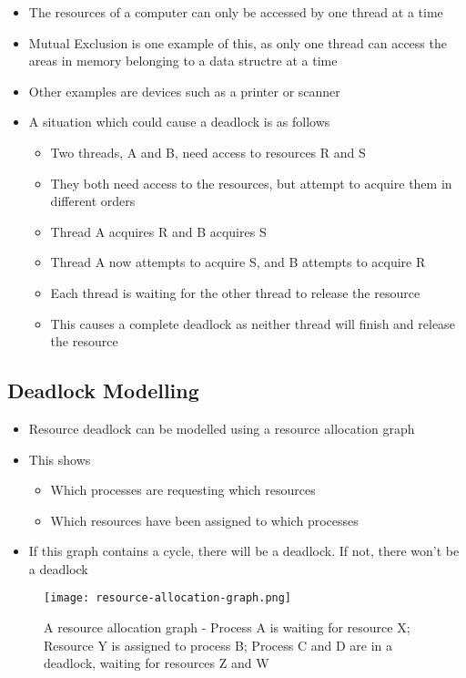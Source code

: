 \begin{itemize}
  \item The resources of a computer can only be accessed by one thread at a time
  \item Mutual Exclusion is one example of this, as only one thread can access the areas in memory belonging to a data structre at a time
  \item Other examples are devices such as a printer or scanner
  \item A situation which could cause a deadlock is as follows
  \begin{itemize}
    \item Two threads, A and B, need access to resources R and S
    \item They both need access to the resources, but attempt to acquire them in different orders
    \item Thread A acquires R and B acquires S
    \item Thread A now attempts to acquire S, and B attempts to acquire R
    \item Each thread is waiting for the other thread to release the resource
    \item This causes a complete deadlock as neither thread will finish and release the resource
  \end{itemize}
\end{itemize}

\subsection*{Deadlock Modelling}

\begin{itemize}
  \item Resource deadlock can be modelled using a resource allocation graph
  \item This shows
  \begin{itemize}
    \item Which processes are requesting which resources
    \item Which resources have been assigned to which processes
  \end{itemize}
  \item If this graph contains a cycle, there will be a deadlock. If not, there won't be a deadlock
\end{itemize}

\begin{figure}[h]
  \centering
  \caption{A resource allocation graph - Process A is waiting for resource X; Resource Y is assigned to process B; Process C and D are in a deadlock, waiting for resources Z and W}
  \texttt{[image: resource-allocation-graph.png]}
\end{figure}

